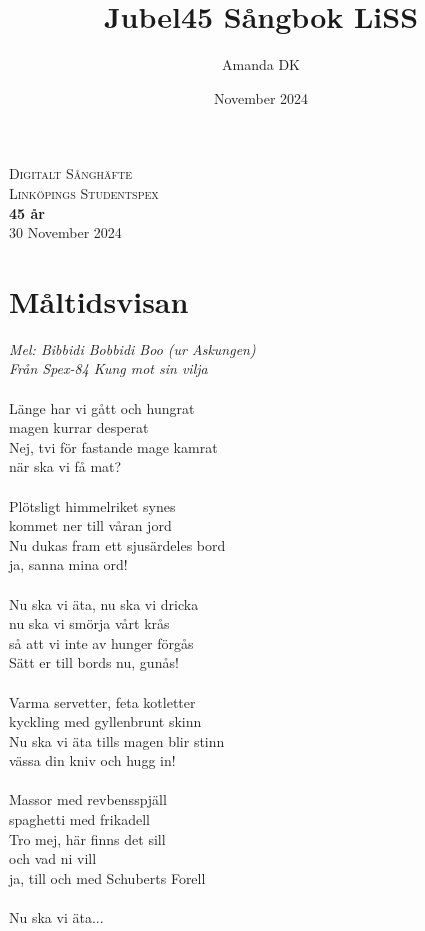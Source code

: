 \documentclass[a5paper,15pt]{article}
\title{Jubel45 Sångbok LiSS}
\author{Amanda DK}
\date{November 2024}
\begin{document}
\vbox{ }

\vbox{ }

\begin{center}
\textsc{\LARGE Digitalt Sånghäfte}\\[1.5cm]
\textsc{\Large Linköpings Studentspex}\\[0.5cm]

\vbox{ }
{ \huge \bfseries 45 år}\\[0.4cm]




{\large 30 November 2024}

\end{center}


\tableofcontents

\setcounter{section}{0}
\renewcommand{\thesection}{S \arabic{section}}

\section{Måltidsvisan}
\emph{Mel: Bibbidi Bobbidi Boo (ur Askungen) \\
Från Spex-84 Kung mot sin vilja}\\
\\
Länge har vi gått och hungrat\\
magen kurrar desperat\\
Nej, tvi för fastande mage kamrat\\
när ska vi få mat?\\
\\
Plötsligt himmelriket synes\\
kommet ner till våran jord\\
Nu dukas fram ett sjusärdeles bord\\
ja, sanna mina ord!\\
\\
Nu ska vi äta, nu ska vi dricka\\
nu ska vi smörja vårt krås\\
så att vi inte av hunger förgås\\
Sätt er till bords nu, gunås!\\
\\
Varma servetter, feta kotletter\\
kyckling med gyllenbrunt skinn\\
Nu ska vi äta tills magen blir stinn\\
vässa din kniv och hugg in!\\
\\
Massor med revbensspjäll\\
spaghetti med frikadell\\
Tro mej, här finns det sill\\
och vad ni vill\\
ja, till och med Schuberts Forell\\
\\
Nu ska vi äta...
\end{document}
